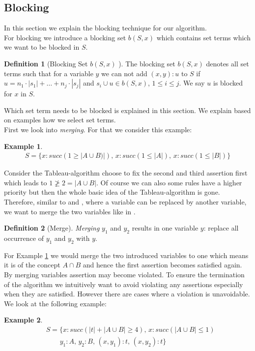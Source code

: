 \documentclass[a4paper,11pt]{scrartcl}
\theoremstyle{break}
\theoremstyle{definition}
\newtheorem{mydef}{Definition}
\newtheorem{ex}{Example}
\newcommand{\RM}[1]{\MakeUppercase{\romannumeral #1{}}}
\begin{document}
\subsection{Blocking}
In this section we explain the blocking technique for our algorithm.\\
For blocking we introduce a blocking set $b(S,x)$ which contains set terms which we want to be blocked in $S$.
\begin{mydef}[Blocking Set $b(S,x)$ \RM{1}]
The blocking set $b(S,x)$ denotes all set terms such that for a variable $y$ we can not add $(x,y):u$ to $S$ if $u=n_1\cdot|s_1|+\dots+n_j\cdot|s_j|$ and $s_i\cup u\in b(S,x)$, $1\leq i\leq j$. We say $u$ is blocked for $x$ in $S$.
\end{mydef}
Which set term needs to be blocked is explained in this section. We explain based on examples how we select set terms.\\
First we look into \textit{merging}. For that we consider this example:
\begin{ex}\label{mergeex1}
\begin{align*}
S=\{x:succ(1\geq |A\cup B)|),\,x:succ(1\leq |A|),\,x:succ(1\leq |B|)\}
\end{align*}
\end{ex}
Consider the Tableau-algorithm choose to fix the second and third assertion first which leads to $1\not\geq 2=|A\cup B|$. Of course we can also some rules have a higher priority but then the whole basic idea of the Tableau-algorithm is gone. Therefore, similar to \cite{1} and \cite{6}, where a variable can be replaced by another variable, we want to merge the two variables like in \cite{2}.
\begin{mydef}[Merge]
\textit{Merging} $y_1$ and $y_2$ results in one variable $y$: replace all occurrence of $y_1$ and $y_2$ with $y$. 
\end{mydef}
For Example \ref{mergeex1} we would merge the two introduced variables to one which means it is of the concept $A\cap B$ and hence the first assertion becomes satisfied again.\\
By merging variables assertion may become violated. To ensure the termination of the algorithm we intuitively want to avoid violating any assertions especially when they are satisfied. However there are cases where a violation is unavoidable. We look at the following example:
\begin{ex}
\begin{align*}
&S=\{x:succ(|t|+|A\cup B|\geq 4),\,x:succ(|A\cup B|\leq 1)\\
&\quad\quad y_1:A,\,y_2:B,\,(x,y_1):t,\,(x,y_2):t\}
\end{align*}
\end{ex}
\end{document}

